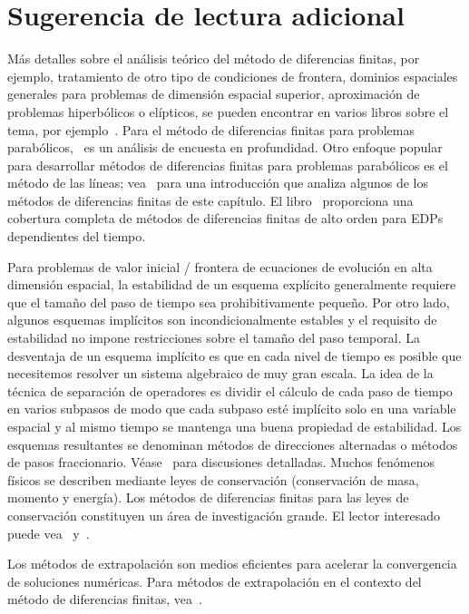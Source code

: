 \section*{Sugerencia de lectura adicional}

Más detalles sobre el análisis teórico del método de diferencias finitas,
por ejemplo, tratamiento de otro tipo de condiciones de frontera,
dominios espaciales generales para problemas de dimensión espacial
superior, aproximación de problemas hiperbólicos o elípticos, se
pueden encontrar en varios libros sobre el tema, por ejemplo~\cite{Strikwerda2004}.
Para el método de diferencias finitas para problemas parabólicos,~\cite{Thomée1990}
es un análisis de encuesta en profundidad.
Otro enfoque popular para desarrollar métodos de diferencias finitas para problemas
parabólicos es el método de las líneas; vea~\cite[pág. 414]{Atkinson1991}
para una introducción que analiza algunos de los métodos de diferencias finitas de este
capítulo.
El libro~\cite{Gustafsson2008} proporciona una cobertura completa de
métodos de diferencias finitas de alto orden para EDPs dependientes del tiempo.

Para problemas de valor inicial / frontera de ecuaciones de evolución en alta dimensión espacial,
la estabilidad de un esquema explícito generalmente requiere que el tamaño del paso de tiempo
sea prohibitivamente pequeño.
Por otro lado, algunos esquemas implícitos son incondicionalmente
estables y el requisito de estabilidad no impone restricciones sobre el
tamaño del paso temporal.
La desventaja de un esquema implícito es que en cada nivel de tiempo
es posible que necesitemos resolver un sistema algebraico de muy gran escala.
La idea de la técnica de separación de operadores es dividir el
cálculo de cada paso de tiempo en varios subpasos de modo que cada
subpaso esté implícito solo en una variable espacial y al mismo
tiempo se mantenga una buena propiedad de estabilidad.
Los esquemas resultantes se denominan métodos de direcciones alternadas o métodos
de pasos fraccionario.
Véase~\cite{Marchuk1990,Yanenko1971} para discusiones detalladas.
Muchos fenómenos físicos se describen mediante leyes de conservación (conservación de masa, momento y energía).
Los métodos de diferencias finitas para las leyes de conservación constituyen un área de investigación grande.
El lector interesado puede vea~\cite{LeVeque1992} y~\cite{Godlewski2021}.

Los métodos de extrapolación son medios eficientes para acelerar la convergencia de soluciones numéricas.
Para métodos de extrapolación en el contexto del método de diferencias finitas, vea~\cite{Marchuk1983}.

